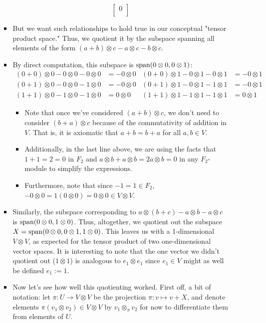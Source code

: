 \documentclass[../notes.tex]{subfiles}
\begin{document}
\begin{itemize}
\begin{itemize}
\begin{itemize}
\begin{equation*}
\begin{bmatrix}
                    0\\
                \end{bmatrix}
            \end{equation*}
            \item But we want such relationships to hold true in our conceptual "tensor product space." Thus, we quotient it by the subspace spanning all elements of the form $(a+b)\otimes c-a\otimes c-b\otimes c$.
            \item By direct computation, this subspace is $\operatorname{span}(0\otimes 0,0\otimes 1)$:
            \begin{align*}
                (0+0)\otimes 0-0\otimes 0-0\otimes 0 &= -0\otimes 0&
                    (0+0)\otimes 1-0\otimes 1-0\otimes 1 &= -0\otimes 1\\
                (0+1)\otimes 0-0\otimes 0-1\otimes 0 &= -0\otimes 0&
                    (0+1)\otimes 1-0\otimes 1-1\otimes 1 &= -0\otimes 1\\
                (1+1)\otimes 0-1\otimes 0-1\otimes 0 &= 0\otimes 0&
                    (1+1)\otimes 1-1\otimes 1-1\otimes 1 &= 0\otimes 1
            \end{align*}
            \begin{itemize}
                \item Note that once we've considered $(a+b)\otimes c$, we don't need to consider $(b+a)\otimes c$ because of the commutativity of addition in $V$. That is, it is axiomatic that $a+b=b+a$ for all $a,b\in V$.
                \item Additionally, in the last line above, we are using the facts that $1+1=2=0$ in $F_2$ and $a\otimes b+a\otimes b=2a\otimes b=0$ in any $F_2$-module to simplify the expressions.
                \item Furthermore, note that since $-1=1\in F_2$, $-0\otimes 0=1(0\otimes 0)=0\otimes 0\in V\otimes V$.
            \end{itemize}
            \item Similarly, the subspace corresponding to $a\otimes(b+c)-a\otimes b-a\otimes c$ is $\operatorname{span}(0\otimes 0,1\otimes 0)$. Thus, altogether, we quotient out the subspace $X=\operatorname{span}(0\otimes 0,0\otimes 1,1\otimes 0)$. This leaves us with a 1-dimensional $V\otimes V$, as expected for the tensor product of two one-dimensional vector spaces. It is interesting to note that the one vector we didn't quotient out ($1\otimes 1$) is analogous to $e_1\otimes e_1$ since $e_1\in V$ might as well be defined $e_1:=1$.
            \item Now let's see how well this quotienting worked. First off, a bit of notation: let $\pi:U\to V\otimes V$ be the projection $\pi:v\mapsto v+X$, and denote elements $\pi(v_1\otimes v_2)\in V\otimes V$ by $v_1\otimes_\pi v_2$ for now to differentiate them from elements of $U$.

\end{itemize}
\end{itemize}
\end{itemize}
\end{document}
